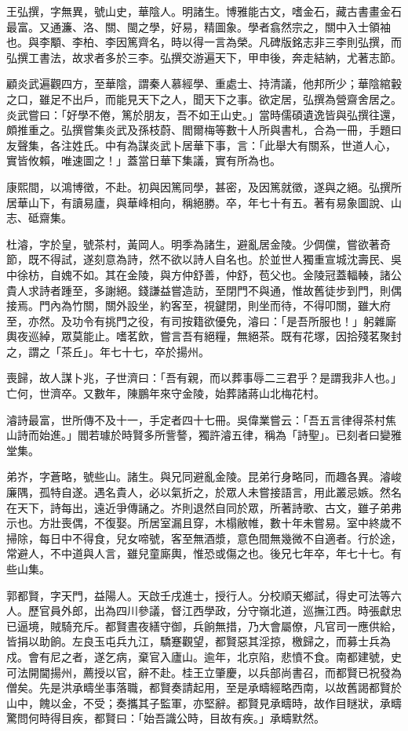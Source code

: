 \begin{pinyinscope}
王弘撰，字無異，號山史，華陰人。明諸生。博雅能古文，嗜金石，藏古書畫金石最富。又通濂、洛、關、閩之學，好易，精圖象。學者翕然宗之，關中入士領袖也。與李顒、李柏、李因篤齊名，時以得一言為榮。凡碑版銘志非三李則弘撰，而弘撰工書法，故求者多於三李。弘撰交游遍天下，甲申後，奔走結納，尤著志節。

顧炎武遍觀四方，至華陰，謂秦人慕經學、重處士、持清議，他邦所少；華陰綰轂之口，雖足不出戶，而能見天下之人，聞天下之事。欲定居，弘撰為營齋舍居之。炎武嘗曰：「好學不倦，篤於朋友，吾不如王山史。」當時儒碩遺逸皆與弘撰往還，頗推重之。弘撰嘗集炎武及孫枝蔚、閻爾梅等數十人所與書札，合為一冊，手題曰友聲集，各注姓氏。中有為謀炎武卜居華下事，言：「此舉大有關系，世道人心，實皆攸賴，唯速圖之！」蓋當日華下集議，實有所為也。

康熙間，以鴻博徵，不赴。初與因篤同學，甚密，及因篤就徵，遂與之絕。弘撰所居華山下，有讀易廬，與華峰相向，稱絕勝。卒，年七十有五。著有易象圖說、山志、砥齋集。

杜濬，字於皇，號茶村，黃岡人。明季為諸生，避亂居金陵。少倜儻，嘗欲著奇節，既不得試，遂刻意為詩，然不欲以詩人自名也。於並世人獨重宣城沈壽民、吳中徐枋，自媿不如。其在金陵，與方仲舒善，仲舒，苞父也。金陵冠蓋輻輳，諸公貴人求詩者踵至，多謝絕。錢謙益嘗造訪，至閉門不與通，惟故舊徒步到門，則偶接焉。門內為竹關，關外設坐，約客至，視鍵閉，則坐而待，不得叩關，雖大府至，亦然。及功令有挑門之役，有司按籍欲優免，濬曰：「是吾所服也！」躬雜廝輿夜巡綽，眾莫能止。嗜茗飲，嘗言吾有絕糧，無絕茶。既有花塚，因拾殘茗聚封之，謂之「茶丘」。年七十七，卒於揚州。

喪歸，故人謀卜兆，子世濟曰：「吾有親，而以葬事辱二三君乎？是謂我非人也。」亡何，世濟卒。又數年，陳鵬年來守金陵，始葬諸蔣山北梅花村。

濬詩最富，世所傳不及十一，手定者四十七冊。吳偉業嘗云：「吾五言律得茶村焦山詩而始進。」閻若璩於時賢多所訾謷，獨許濬五律，稱為「詩聖」。已刻者曰變雅堂集。

弟岕，字蒼略，號些山。諸生。與兄同避亂金陵。昆弟行身略同，而趣各異。濬峻廉隅，孤特自遂。遇名貴人，必以氣折之，於眾人未嘗接語言，用此叢忌嫉。然名在天下，詩每出，遠近爭傳誦之。岕則退然自同於眾，所著詩歌、古文，雖子弟弗示也。方壯喪偶，不復娶。所居室漏且穿，木榻敝帷，數十年未嘗易。室中終歲不掃除，每日中不得食，兒女啼號，客至無酒漿，意色間無幾微不自適者。行於途，常避人，不中道與人言，雖兒童廝輿，惟恐或傷之也。後兄七年卒，年七十七。有些山集。

郭都賢，字天門，益陽人。天啟壬戌進士，授行人。分校順天鄉試，得史可法等六人。歷官員外郎，出為四川參議，督江西學政，分守嶺北道，巡撫江西。時張獻忠已逼境，賊騎充斥。都賢晝夜繕守御，兵餉無措，乃大會屬僚，凡官司一應供給，皆捐以助餉。左良玉屯兵九江，驕蹇觀望，都賢惡其淫掠，檄歸之，而募士兵為戍。會有尼之者，遂乞病，棄官入廬山。逾年，北京陷，悲憤不食。南都建號，史可法開閫揚州，薦授以官，辭不赴。桂王立肇慶，以兵部尚書召，而都賢已祝發為僧矣。先是洪承疇坐事落職，都賢奏請起用，至是承疇經略西南，以故舊謁都賢於山中，餽以金，不受；奏攜其子監軍，亦堅辭。都賢見承疇時，故作目瞇狀，承疇驚問何時得目疾，都賢曰：「始吾識公時，目故有疾。」承疇默然。


\end{pinyinscope}
